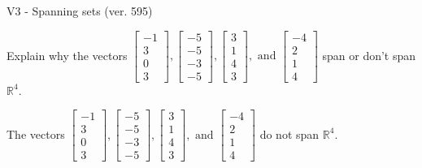 \begin{exercise}
  \begin{exerciseTitle}V3 - Spanning sets (ver. 595)\end{exerciseTitle}
  \begin{exerciseStatement}
    Explain why the vectors \(\left[\begin{array}{r}
-1 \\
3 \\
0 \\
3
\end{array}\right] , \left[\begin{array}{r}
-5 \\
-5 \\
-3 \\
-5
\end{array}\right] , \left[\begin{array}{r}
3 \\
1 \\
4 \\
3
\end{array}\right] , \text{ and } \left[\begin{array}{r}
-4 \\
2 \\
1 \\
4
\end{array}\right]\) span or don't span \(\mathbb{R}^4\). 
	


  \end{exerciseStatement}
  \begin{exerciseAnswer}
   The vectors \(\left[\begin{array}{r}
-1 \\
3 \\
0 \\
3
\end{array}\right] , \left[\begin{array}{r}
-5 \\
-5 \\
-3 \\
-5
\end{array}\right] , \left[\begin{array}{r}
3 \\
1 \\
4 \\
3
\end{array}\right] , \text{ and } \left[\begin{array}{r}
-4 \\
2 \\
1 \\
4
\end{array}\right]\) 
  	 do not  
	span \(\mathbb{R}^4\).
  


  \end{exerciseAnswer}
\end{exercise}
